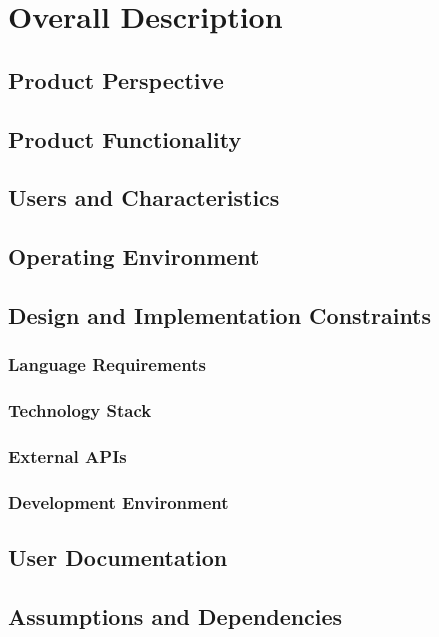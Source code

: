 
\section{Overall Description}\label{sec:overall-description}
    \subsection{Product Perspective}\label{sec:product-perspective}
    \subsection{Product Functionality}\label{sec:product-functionality}
    \subsection{Users and Characteristics}\label{sec:users-characteristics}
    \subsection{Operating Environment}\label{sec:operating-environment}
    \subsection{Design and Implementation Constraints}\label{sec:design-constraints}
        \subsubsection{Language Requirements}\label{sec:language-requirements}
        \subsubsection{Technology Stack}\label{sec:technology-stack}
        \subsubsection{External APIs}\label{sec:external-apis}
        \subsubsection{Development Environment}\label{sec:development-environment}
    \subsection{User Documentation}\label{sec:user-documentation}
    \subsection{Assumptions and Dependencies}\label{sec:assumptions-dependencies}
